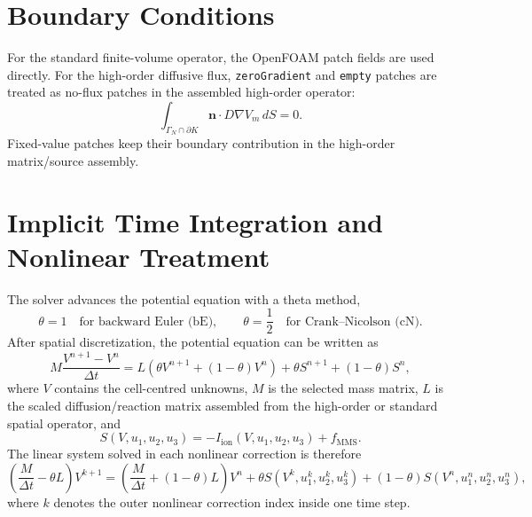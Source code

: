 \documentclass[11pt,a4paper]{article}
\newcommand{\code}[1]{\texttt{#1}}
\begin{document}
\section{Boundary Conditions}
For the standard finite-volume operator, the OpenFOAM patch fields are used directly. For the high-order diffusive flux, \code{zeroGradient} and \code{empty} patches are treated as no-flux patches in the assembled high-order operator:
\begin{equation}
\int_{\Gamma_N\cap\partial K} \mathbf{n}\cdot D\nabla V_m\,dS = 0.
\end{equation}
Fixed-value patches keep their boundary contribution in the high-order matrix/source assembly.

\section{Implicit Time Integration and Nonlinear Treatment}
The solver advances the potential equation with a theta method,
\begin{equation}
\theta = 1 \quad \text{for backward Euler (bE)}, \qquad
\theta = \frac{1}{2} \quad \text{for Crank--Nicolson (cN)}.
\end{equation}
After spatial discretization, the potential equation can be written as
\begin{equation}
M\frac{V^{n+1}-V^n}{\Delta t}
= L\left(\theta V^{n+1}+(1-\theta)V^n\right)
+ \theta S^{n+1} + (1-\theta)S^n,
\end{equation}
where $V$ contains the cell-centred unknowns, $M$ is the selected mass matrix,
$L$ is the scaled diffusion/reaction matrix assembled from the high-order or
standard spatial operator, and
\begin{equation}
S(V,u_1,u_2,u_3) = -I_{\mathrm{ion}}(V,u_1,u_2,u_3) + f_{\mathrm{MMS}}.
\end{equation}
The linear system solved in each nonlinear correction is therefore
\begin{equation}
\left(\frac{M}{\Delta t} - \theta L\right)V^{k+1}
= \left(\frac{M}{\Delta t} + (1-\theta)L\right)V^n
+ \theta S(V^k,u_1^k,u_2^k,u_3^k)
+ (1-\theta)S(V^n,u_1^n,u_2^n,u_3^n),
\label{eq:picard-potential-solve}
\end{equation}
where $k$ denotes the outer nonlinear correction index inside one time step.
\end{document}
